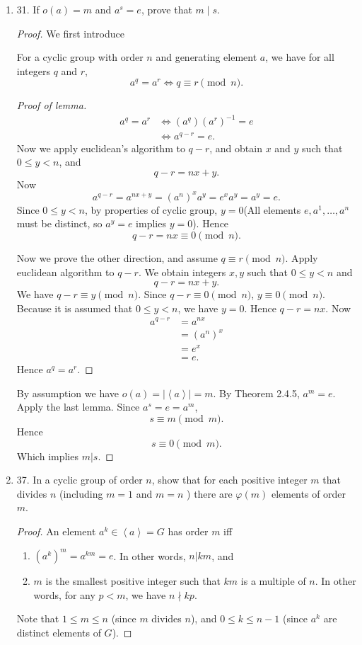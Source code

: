 \begin{enumerate}
	\item 31. If $o(a)=m$ and $a^s=e$, prove that $m \mid s$.
\begin{proof}
	We first introduce
\begin{lemma}
	For a cyclic group with order $n$ and generating element $a$, we have for all integers $q$ and $r$, \[
		a^q = a^r \iff q \equiv r \pmod n
	.\] 
\end{lemma}
\begin{proof}[Proof of lemma]
	\begin{align*}
		a^q = a^r &\iff (a^q)(a^r)^{-1} = e \\
			  &\iff a^{q-r} = e
	.\end{align*}
	Now we apply euclidean's algorithm to $q-r$, and obtain $x$ and $y$ such that $0\le y<n$, and
	\[
		q-r = n x + y
	.\] 
	Now 
	\[
		a^{q-r} = a^{n x + y} =  \left( a^n \right) ^x a^y = e^x a^y = a^y = e
	.\] 
	Since $0\le y<n$, by properties of cyclic group, $y = 0$(All elements $e, a^1, \ldots, a^n$ must be distinct, so $a^y =  e $ implies $y =0$). Hence
	\[
		q - r = n x \equiv 0 \pmod n
	.\] 

	Now we prove the other direction, and assume $q \equiv r \pmod n$. Apply euclidean algorithm to $q - r$. We obtain integers $x, y$ such that $0\le y < n$  and \[
		q - r = n x + y
	.\] 
	We have $q-r \equiv y \pmod n$. Since $q -r \equiv 0 \pmod n$, $y \equiv 0 \pmod n$. Because it is assumed that  $0\le y<n$, we have $y = 0$. Hence $q - r = nx$. Now
	\begin{align*}
		a^{q-r} &= a^{nx}\\
		&= (a^n)^x \\
		&= e^x \\
			&= e 
	.\end{align*}
	Hence $a^q = a^r $.
\end{proof}

By assumption we have $o(a) = |\left\langle a \right\rangle | = m$. By Theorem 2.4.5, $a^m = e$. Apply the last lemma. Since $a^s = e = a^m$, \[
	s \equiv m \pmod m
.\] 
Hence
\[
	s \equiv 0 \pmod m
.\] 
Which implies $m | s$.
\end{proof}
\newpage

\item 37. In a cyclic group of order $n$, show that for each positive integer $m$ that divides $n$ (including $m=1$ and $m=n$ ) there are $\varphi(m)$ elements of order $m$. 
\begin{proof}
	An element $a^k \in \left\langle a \right\rangle = G$ has order $m$ iff
	\begin{enumerate}
		\item $(a^k)^m = a^{km} = e$. In other words, $n | k m$, and
		\item $m$ is the smallest positive integer such that $ km $ is a multiple of $n$. In other words, for any $p < m$, we have $n \nmid kp$.
	\end{enumerate}
	Note that $1\le m\le n$ (since $m$ divides $n $), and $0\le k\le n-1$ (since $a^k$ are distinct elements of $G$).


\end{proof}
\end{enumerate}

